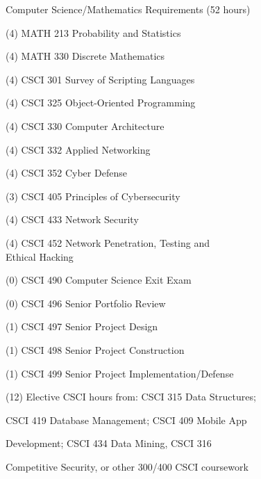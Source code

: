 \begin{reqgroup}{Computer Science/Mathematics Requirements (52 hours)}
\begin{checklist}
\begin{minipage}[t]{0.5\linewidth}
	\item (4) MATH 213 Probability and Statistics
	\item (4) MATH 330 Discrete Mathematics
	\item (4) CSCI 301 Survey of Scripting Languages
	\item (4) CSCI 325 Object-Oriented Programming
	\item (4) CSCI 330 Computer Architecture
	\item (4) CSCI 332 Applied Networking
	\item (4) CSCI 352 Cyber Defense
	\item (3) CSCI 405 Principles of Cybersecurity
	\item (4) CSCI 433 Network Security
	\item (4) CSCI 452 Network Penetration, Testing and\\Ethical Hacking
\end{minipage}
\begin{minipage}[t]{0.5\linewidth}
	\item (0) CSCI 490 Computer Science Exit Exam
	\item (0) CSCI 496 Senior Portfolio Review
	\item (1) CSCI 497 Senior Project Design
	\item (1) CSCI 498 Senior Project Construction
	\item (1) CSCI 499 Senior Project Implementation/Defense
	\item (12) Elective CSCI hours from: CSCI 315 Data Structures;
	\item \hspace{1em} CSCI 419 Database Management; CSCI 409 Mobile App
	\item \hspace{1em} Development; CSCI 434 Data Mining, CSCI 316
	\item[] \hspace{1em} Competitive Security, or other 300/400 CSCI coursework


\end{minipage}
\end{checklist}
\end{reqgroup}

